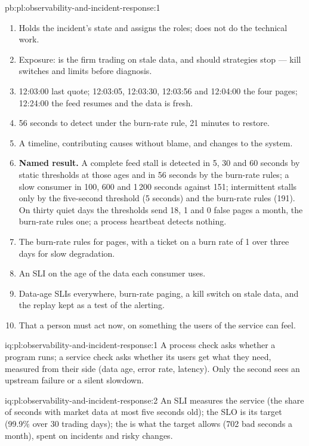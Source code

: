 \begin{solution}{pb:pl:observability-and-incident-response:1}
\begin{enumerate}
\item Holds the incident's state and assigns the roles; does not do the technical work.
\item Exposure: is the firm trading on stale data, and should strategies stop --- kill switches and limits before diagnosis.
\item 12:03:00 last quote; 12:03:05, 12:03:30, 12:03:56 and 12:04:00 the four pages; 12:24:00 the feed resumes and the data is fresh.
\item 56 seconds to detect under the burn-rate rule, 21 minutes to restore.
\item A timeline, contributing causes without blame, and changes to the system.
\item \textbf{Named result.} A complete feed stall is detected in 5, 30 and 60 seconds by static thresholds at those ages and in 56 seconds by
the burn-rate rules; a slow consumer in 100, 600 and 1\,200 seconds against 151; intermittent stalls only by the five-second threshold (5
seconds) and the burn-rate rules (191). On thirty quiet days the thresholds send 18, 1 and 0 false pages a month, the burn-rate rules one;
a process heartbeat detects nothing.
\item The burn-rate rules for pages, with a ticket on a burn rate of 1 over three days for slow degradation.
\item An SLI on the age of the data each consumer uses.
\item Data-age SLIs everywhere, burn-rate paging, a kill switch on stale data, and the replay kept as a test of the alerting.
\item That a person must act now, on something the users of the service can feel.
\end{enumerate}
\end{solution}

\begin{solution}{iq:pl:observability-and-incident-response:1}
A process check asks whether a program runs; a service check asks whether its users get what they need, measured from their side (data age,
error rate, latency). Only the second sees an upstream failure or a silent slowdown.
\end{solution}

\begin{solution}{iq:pl:observability-and-incident-response:2}
An SLI measures the service (the share of seconds with market data at most five seconds old); the SLO is its target (99.9\% over 30 trading
days); the  is what the target allows (702 bad seconds a month), spent on incidents and risky changes.
\end{solution}

